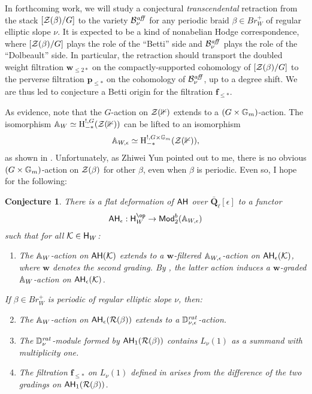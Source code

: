 \documentclass[a4paper,10pt,leqno]{amsart}
\theoremstyle{plain}
\theoremstyle{plain}
\theoremstyle{plain}
\newtheorem{conj}[mainthm]{Conjecture}
\theoremstyle{definition}
\theoremstyle{remark}
\newcommand{\Br}{\mathit{Br}}
\newcommand{\Mod}{\mathsf{Mod}}
\newcommand{\QL}{\bar{\mathbf{Q}}_\ell}
\renewcommand{\aff}{\mathit{aff}}
\newcommand{\rat}{\mathit{rat}}
\newcommand{\slope}{\nu}
\begin{document}
In forthcoming work, we will study a conjectural \emph{transcendental} retraction from the stack $[\cal{Z}(\beta)/G]$ to the variety $\cal{B}_\slope^\aff$ for any periodic braid $\beta \in \Br_W^+$ of regular elliptic slope $\slope$.
It is expected to be a kind of nonabelian Hodge correspondence, where $[\cal{Z}(\beta)/G]$ plays the role of the ``Betti'' side and $\cal{B}_\slope^\aff$ plays the role of the ``Dolbeault'' side.
In particular, the retraction should transport the doubled weight filtration $\bm{w}_{\leq 2\ast}$ on the compactly-supported cohomology of $[\cal{Z}(\beta)/G]$ to the perverse filtration $\bm{p}_{\leq \ast}$ on the cohomology of $\cal{B}_\slope^\aff$, up to a degree shift.
We are thus led to conjecture a Betti origin for the filtration $\bm{f}_{\leq \ast}$.

As evidence, note that the $G$-action on $\cal{Z}(\bb{1})$ extends to a $(G \times \bb{G}_m)$-action.
The isomorphism $\bb{A}_W \simeq \ur{H}_{-\ast}^{!, G}(\cal{Z}(\bb{1}))$ can be lifted to an isomorphism
\begin{align}
\bb{A}_{W, \epsilon} \simeq \ur{H}_{-\ast}^{!, G \times \bb{G}_m}(\cal{Z}(\bb{1})),
\end{align}
as shown in \cite{lusztig_1988}.
Unfortunately, as Zhiwei Yun pointed out to me, there is no obvious $(G \times \bb{G}_m)$-action on $\cal{Z}(\beta)$ for other $\beta$, even when $\beta$ is periodic.
Even so, I hope for the following:

\begin{conj}\label{conj:daha}
There is a flat deformation of $\sf{AH}$ over $\QL[\epsilon]$ to a functor 
\begin{align}
\sf{AH}_\epsilon : \sf{H}_W^\op \to \Mod_2^b(\bb{A}_{W, \epsilon})
\end{align}
such that for all $\cal{K} \in \sf{H}_W$:
\begin{enumerate}
\item 	The $\bb{A}_W$-action on $\sf{AH}(\cal{K})$ extends to a $\bm{w}$-\emph{filtered} $\bb{A}_{W, \epsilon}$-action on $\sf{AH}_\epsilon(\cal{K})$, where $\bm{w}$ denotes the second grading.
By \cite[Prop.\ 4.3.1]{oy}, the latter action induces a $\bm{w}$-\emph{graded} $\bb{A}_W$-action on $\sf{AH}_\epsilon(\cal{K})$.
\end{enumerate}
If $\beta \in \Br_W^+$ is periodic of regular elliptic slope $\slope$, then:
\begin{enumerate}\setcounter{enumi}{1}
\item 	The $\bb{A}_W$-action on $\sf{AH}_\epsilon(\cal{R}(\beta))$ extends to a $\bb{D}_{\slope, \epsilon}^\rat$-action.
\item 	The $\bb{D}_\slope^\rat$-module formed by $\sf{AH}_1(\cal{R}(\beta))$ contains $L_\slope(1)$ as a summand with multiplicity one.
\item 	The filtration $\bm{f}_{\leq \ast}$ on $L_\slope(1)$ defined in \cite{gors} arises from the difference of the two gradings on $\sf{AH}_1(\cal{R}(\beta))$.
\end{enumerate}
\end{conj}
\end{document}
